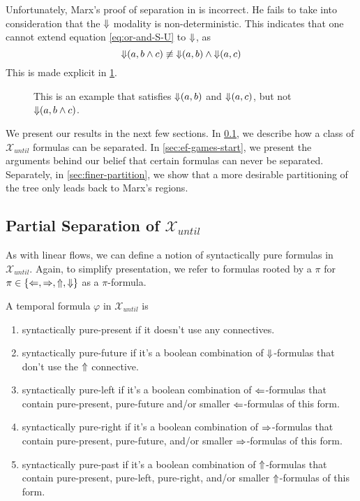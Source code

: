 \documentclass[a4paper,UKenglish,cleveref, autoref, thm-restate, numberwithinsect]{lipics-v2021}
\def\Larrow{\ensuremath\mathord{\Leftarrow}}
\def\Rarrow{\ensuremath\mathord{\Rightarrow}}
\def\Uarrow{\ensuremath\mathord{\Uparrow}}
\def\Darrow{\ensuremath\mathord{\Downarrow}}
\begin{document}
Unfortunately, Marx's proof of separation in \cite{xpathComplete} is incorrect. He fails to take into consideration that the $\Darrow$ modality is non-deterministic. This indicates that one cannot extend equation \eqref{eq:or-and-S-U} to $\Darrow$, as
\begin{equation*}
    \Darrow(a, b \land c) \not\equiv \Darrow(a, b) \land \Darrow(a, c)
\end{equation*}
This is made explicit in \cref{fig:darrow-a-b-and-c}.
\begin{figure}[h]
    \centering
    \caption[]{This is an example that satisfies $\Darrow(a, b)$ and $\Darrow(a, c)$, but not $\Darrow(a, b \land c)$.}
    \label{fig:darrow-a-b-and-c}
\end{figure}

We present our results in the next few sections. In \cref{sec:partial-separation-start}, we describe how a class of $\mathcal{X}_{until}$ formulas can be separated. In \cref{sec:ef-games-start}, we present the arguments behind our belief that certain formulas can never be separated. Separately, in \cref{sec:finer-partition}, we show that a more desirable partitioning of the tree only leads back to Marx's regions.

\subsection{Partial Separation of $\mathcal{X}_{until}$}
\label{sec:partial-separation-start}

As with linear flows, we can define a notion of syntactically pure formulas in $\mathcal{X}_{until}$. Again, to simplify presentation, we refer to formulas rooted by a $\pi$ for $\pi \in \{\Larrow, \Rarrow, \Uarrow, \Darrow\}$ as a $\pi$-formula.
\begin{definition}
    A temporal formula $\varphi$ in $\mathcal{X}_{until}$ is
    \begin{enumerate}
        \item syntactically pure-present if it doesn't use any connectives.
        \item syntactically pure-future if it's a boolean combination of $\Darrow$-formulas that don't use the $\Uarrow$ connective.
        \item syntactically pure-left if it's a boolean combination of $\Larrow$-formulas that contain pure-present, pure-future and/or smaller $\Larrow$-formulas of this form.
        \item syntactically pure-right if it's a boolean combination of $\Rarrow$-formulas that contain pure-present, pure-future, and/or smaller $\Rarrow$-formulas of this form.
        \item syntactically pure-past if it's a boolean combination of $\Uarrow$-formulas that contain pure-present, pure-left, pure-right, and/or smaller $\Uarrow$-formulas of this form.
    \end{enumerate}
\end{definition}
\end{document}
